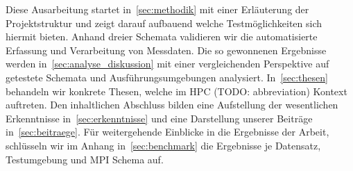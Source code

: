 Diese Ausarbeitung startet in~\ref{sec:methodik} mit einer Erläuterung der Projektstruktur und zeigt darauf aufbauend welche Testmöglichkeiten sich hiermit bieten. Anhand dreier Schemata validieren wir die automatisierte Erfassung und Verarbeitung von Messdaten. Die so gewonnenen Ergebnisse werden in~\ref{sec:analyse_diskussion} mit einer vergleichenden Perspektive auf getestete Schemata und Ausführungsumgebungen analysiert. In~\ref{sec:thesen} behandeln wir konkrete Thesen, welche im HPC (TODO: abbreviation) Kontext auftreten.
Den inhaltlichen Abschluss bilden eine Aufstellung der wesentlichen Erkenntnisse in~\ref{sec:erkenntnisse} und eine Darstellung unserer Beiträge in~\ref{sec:beitraege}. Für weitergehende Einblicke in die Ergebnisse der Arbeit, schlüsseln wir im Anhang in~\ref{sec:benchmark} die Ergebnisse je Datensatz, Testumgebung und MPI Schema auf.
